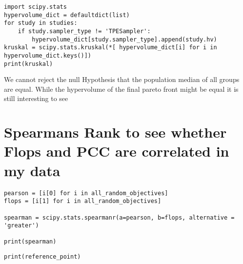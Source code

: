 \documentclass[11pt]{article}
\begin{document}
\begin{verbatim}
import scipy.stats
hypervolume_dict = defaultdict(list)
for study in studies:
    if study.sampler_type != 'TPESampler':
        hypervolume_dict[study.sampler_type].append(study.hv)
kruskal = scipy.stats.kruskal(*[ hypervolume_dict[i] for i in hypervolume_dict.keys()])
print(kruskal)

\end{verbatim}
We cannot reject the null Hypothesis that the population median of all groups are equal. While the hypervolume of the final pareto front might be equal it is still interesting to see

\section{Spearmans Rank to see whether Flops and PCC are correlated in my data}
\label{sec:orgfd859d4}

\begin{verbatim}
pearson = [i[0] for i in all_random_objectives]
flops = [i[1] for i in all_random_objectives]

spearman = scipy.stats.spearmanr(a=pearson, b=flops, alternative = 'greater')

print(spearman)
\end{verbatim}

\begin{verbatim}
print(reference_point)
\end{verbatim}
\end{document}
